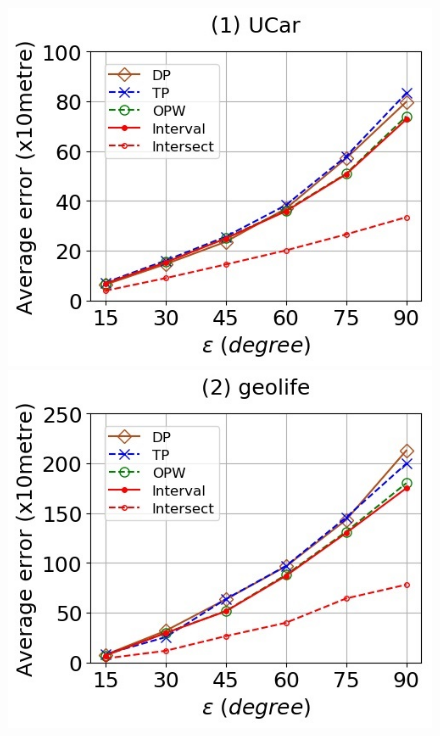\begin{figure}[tb!]
	\centering
	\includegraphics[scale = 0.400]{Figures/Exp-where-DAD-error-epsilon-service.jpg}\hspace{2ex}
	\includegraphics[scale = 0.400]{Figures/Exp-where-DAD-error-epsilon-geolife.jpg}\hspace{2ex}

\end{figure}
